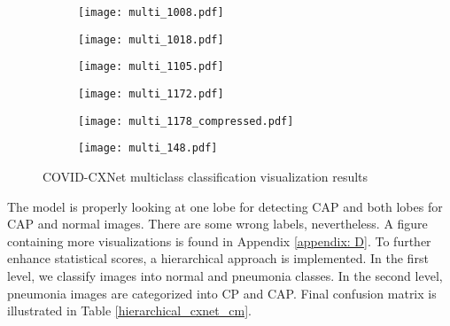 \documentclass{article}
\begin{document}
\begin{figure}[H]
    \begin{subfigure}{0.33\linewidth}
        \centering
        \texttt{[image: multi\_1008.pdf]}
        \label{fig:multiclass1}
    \end{subfigure}
\begin{subfigure}{0.33\linewidth}
        \centering
        \texttt{[image: multi\_1018.pdf]}
        \label{fig:multiclass2}
    \end{subfigure}
\begin{subfigure}{0.33\linewidth}
        \centering
        \texttt{[image: multi\_1105.pdf]}
        \label{fig:multiclass3}
    \end{subfigure}
\begin{subfigure}{0.33\linewidth}
        \centering
        \texttt{[image: multi\_1172.pdf]}
        \label{fig:multiclass4}
    \end{subfigure}
\begin{subfigure}{0.33\linewidth}
        \centering
        \texttt{[image: multi\_1178\_compressed.pdf]}
        \label{fig:multiclass5}
    \end{subfigure}
\begin{subfigure}{0.33\linewidth}
        \centering
        \texttt{[image: multi\_148.pdf]}
        \label{fig:multiclass6}
    \end{subfigure}

\caption{COVID-CXNet multiclass classification visualization results}
\label{fig:multiclass_heatmaps}
\end{figure}

The model is properly looking at one lobe for detecting CAP and both lobes for CAP and normal images. There are some wrong labels, nevertheless. A figure containing more visualizations is found in Appendix \ref{appendix: D}. To further enhance statistical scores, a hierarchical approach is implemented. In the first level, we classify images into normal and pneumonia classes. In the second level, pneumonia images are categorized into CP and CAP. Final confusion matrix is illustrated in Table \ref{hierarchical_cxnet_cm}.
\end{document}
